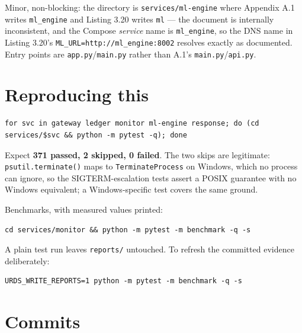 \documentclass[11pt,a4paper]{article}
\begin{document}
\vspace{0.8em}

Minor, non-blocking: the directory is \texttt{services/ml-engine} where Appendix A.1
writes \texttt{ml\_engine} and Listing 3.20 writes \texttt{ml} --- the document is internally
inconsistent, and the Compose \emph{service} name is \texttt{ml\_engine}, so the DNS name in
Listing 3.20's \texttt{ML\_URL=http://ml\_engine:8002} resolves exactly as documented.
Entry points are \texttt{app.py}/\texttt{main.py} rather than A.1's \texttt{main.py}/\texttt{api.py}.

\section{Reproducing this}

\begin{lstlisting}
for svc in gateway ledger monitor ml-engine response; do (cd services/$svc && python -m pytest -q); done
\end{lstlisting}

Expect \textbf{371 passed, 2 skipped, 0 failed}. The two skips are legitimate:
\texttt{psutil.terminate()} maps to \texttt{TerminateProcess} on Windows, which no process can
ignore, so the SIGTERM-escalation tests assert a POSIX guarantee with no Windows
equivalent; a Windows-specific test covers the same ground.

Benchmarks, with measured values printed:

\begin{lstlisting}
cd services/monitor && python -m pytest -m benchmark -q -s
\end{lstlisting}

A plain test run leaves \texttt{reports/} untouched. To refresh the committed evidence
deliberately:

\begin{lstlisting}
URDS_WRITE_REPORTS=1 python -m pytest -m benchmark -q -s
\end{lstlisting}

\section{Commits}
\end{document}
